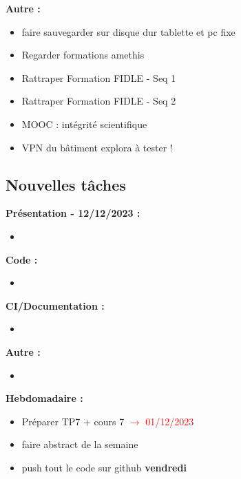 \textbf{Autre :}
\begin{itemize}[label=$\square$] 
	\item[\previous{4}] faire sauvegarder sur disque dur tablette et pc fixe
	\item[\previous{6}] Regarder formations amethis
	\item[\previous{7}] Rattraper Formation FIDLE - Seq 1
	\item[\previous{8}] Rattraper Formation FIDLE - Seq 2
	\item[\previous{8}] MOOC : intégrité scientifique
	\item[\previous{8}] VPN du bâtiment explora à tester !
\end{itemize}

\newpage

\subsection*{Nouvelles tâches}

\textbf{Présentation - 12/12/2023 :}
\begin{itemize}[label=$\square$] 
	\item 
\end{itemize}
\textbf{Code :}
\begin{itemize}[label=$\square$] 
	\item
\end{itemize}
\textbf{CI/Documentation :}
\begin{itemize}[label=$\square$] 
	\item 
\end{itemize}
\textbf{Autre :}
\begin{itemize}[label=$\square$] 
	\item
\end{itemize}
\textbf{Hebdomadaire :}
\begin{itemize}[label=$\square$] 
	\item[\done] Préparer TP7 + cours 7 \textcolor{red}{$\rightarrow$ 01/12/2023}
	\item faire abstract de la semaine 
	\item push tout le code sur github \textbf{vendredi}
\end{itemize}